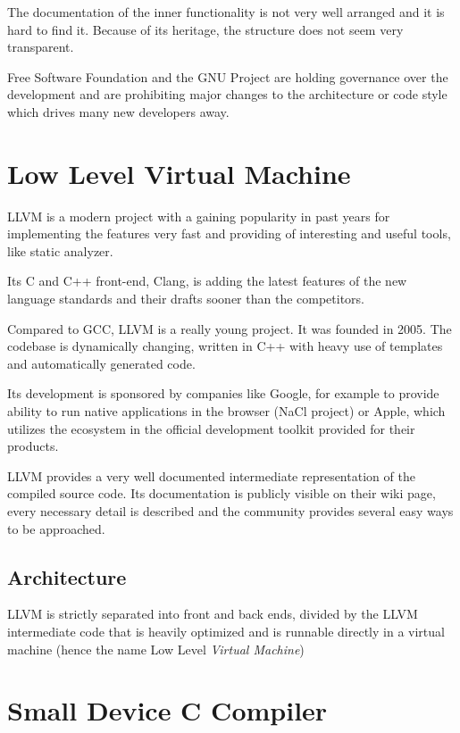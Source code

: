    The documentation of the inner functionality is not very well arranged and it is hard to find it. Because of its heritage, the structure does not seem very transparent.

    Free Software Foundation and the GNU Project are holding governance over the development and are prohibiting major changes to the architecture or code style which drives many new developers away.

    \section{Low Level Virtual Machine}\label{llvm}

    LLVM is a modern project with a gaining popularity in past years for implementing the features very fast and providing of interesting and useful tools, like static analyzer.

    Its C and C++ front-end, Clang, is adding the latest features of the new language standards and their drafts sooner than the competitors.

    Compared to GCC, LLVM is a really young project. It was founded in 2005. The codebase is dynamically changing, written in C++ with heavy use of templates and automatically generated code.

    Its development is sponsored by companies like Google, for example to provide ability to run native applications in the browser (NaCl project) or Apple, which utilizes the ecosystem in the official development toolkit provided for their products.

    LLVM provides a very well documented intermediate representation of the compiled source code. Its documentation is publicly visible on their wiki page, every necessary detail is described and the community provides several easy ways to be approached.

        \subsection{Architecture}

        LLVM is strictly separated into front and back ends, divided by the LLVM intermediate code that is heavily optimized and is runnable directly in a virtual machine (hence the name Low Level \emph{Virtual Machine})

    \section{Small Device C Compiler}\label{sdcc}

